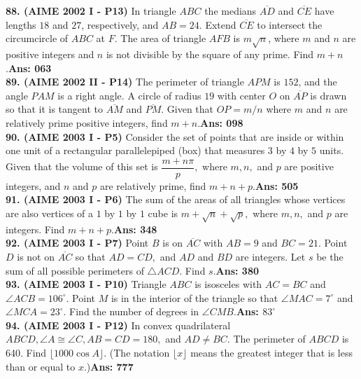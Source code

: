 \documentclass[letterpaper,10pt,addpoints]{exam}
\begin{document}
\textbf{88. (AIME 2002 I - P13) }In triangle $ABC$ the medians $\overline{AD}$ and $\overline{CE}$ have lengths $18$ and $27$, respectively, and $AB=24$. Extend $\overline{CE}$ to intersect the circumcircle of $ABC$ at $F$. The area of triangle $AFB$ is $m\sqrt{n}$, where $m$ and $n$ are positive integers and $n$ is not divisible by the square of any prime. Find $m+n$.\quad\textbf{Ans: 063}\\

\textbf{89. (AIME 2002 II - P14) }The perimeter of triangle $APM$ is $152$, and the angle $PAM$ is a right angle. A circle of radius $19$ with center $O$ on $\overline{AP}$ is drawn so that it is tangent to $\overline{AM}$ and $\overline{PM}$. Given that $OP=m/n$ where $m$ and $n$ are relatively prime positive integers, find $m+n$.\quad\textbf{Ans: 098}\\

\textbf{90. (AIME 2003 I - P5) }Consider the set of points that are inside or within one unit of a rectangular parallelepiped (box) that measures $3$ by $4$ by $5$ units. Given that the volume of this set is $\dfrac{m + n\pi}{p},$ where $m, n,$ and $p$ are positive integers, and $n$ and $p$ are relatively prime, find $m + n + p.$\quad\textbf{Ans: 505}\\

\textbf{91. (AIME 2003 I - P6) }The sum of the areas of all triangles whose vertices are also vertices of a $1$ by $1$ by $1$ cube is $m + \sqrt{n} + \sqrt{p},$ where $m, n,$ and $p$ are integers. Find $m + n + p.$\quad\textbf{Ans: 348}\\

\textbf{92. (AIME 2003 I - P7) }Point $B$ is on $\overline{AC}$ with $AB = 9$ and $BC = 21.$ Point $D$ is not on $\overline{AC}$ so that $AD = CD,$ and $AD$ and $BD$ are integers. Let $s$ be the sum of all possible perimeters of $\triangle ACD$. Find $s.$\quad\textbf{Ans: 380}\\

\textbf{93. (AIME 2003 I - P10) }Triangle $ABC$ is isosceles with $AC = BC$ and $\angle ACB = 106^\circ.$ Point $M$ is in the interior of the triangle so that $\angle MAC = 7^\circ$ and $\angle MCA = 23^\circ.$ Find the number of degrees in $\angle CMB.$\quad\textbf{Ans: $83^{\circ}$}\\

\textbf{94. (AIME 2003 I - P12) }In convex quadrilateral $ABCD, \angle A \cong \angle C, AB = CD = 180,$ and $AD \neq BC.$ The perimeter of $ABCD$ is 640. Find $\lfloor 1000 \cos A \rfloor.$ (The notation $\lfloor x \rfloor$ means the greatest integer that is less than or equal to $x.$)\quad\textbf{Ans: 777}\\
\end{document}

